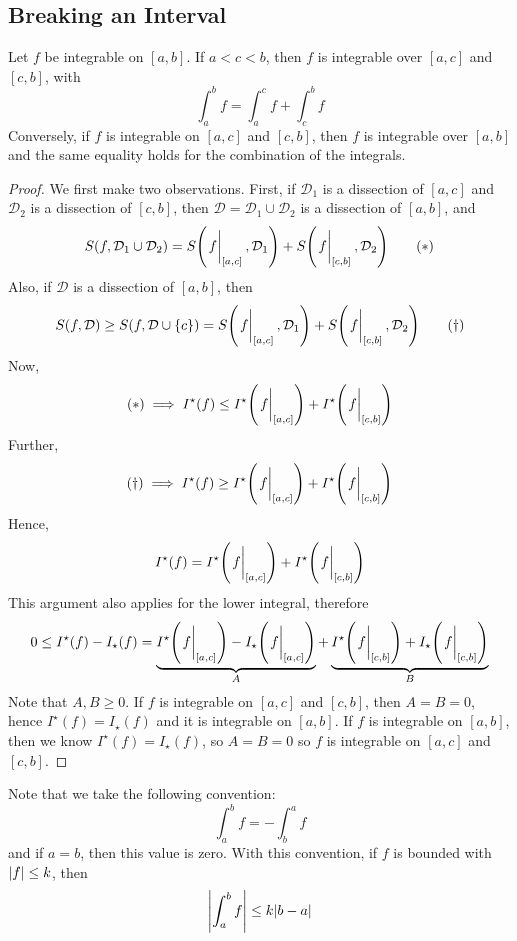 \subsection{Breaking an Interval}
Let $f$ be integrable on $[a, b]$. If $a < c < b$, then $f$ is integrable over $[a, c]$ and $[c, b]$, with
\[ \int_a^b f = \int_a^c f + \int_c^b f \]
Conversely, if $f$ is integrable on $[a, c]$ and $[c, b]$, then $f$ is integrable over $[a, b]$ and the same equality holds for the combination of the integrals.
\begin{proof}
	We first make two observations. First, if $\mathcal D_1$ is a dissection of $[a, c]$ and $\mathcal D_2$ is a dissection of $[c, b]$, then $\mathcal D = \mathcal D_1 \cup \mathcal D_2$ is a dissection of $[a, b]$, and
	\begin{equation}
		S(f, \mathcal D_1 \cup \mathcal D_2) = S\qty(\eval{f}_{[a, c]}, \mathcal D_1) + S\qty(\eval{f}_{[c, b]}, \mathcal D_2)
		\tag{$\ast$}
	\end{equation}
	Also, if $\mathcal D$ is a dissection of $[a, b]$, then
	\begin{equation}
		S(f, \mathcal D) \geq S(f, \mathcal D \cup \{ c \}) = S\qty(\eval{f}_{[a, c]}, \mathcal D_1) + S\qty(\eval{f}_{[c, b]}, \mathcal D_2)
		\tag{$\dagger$}
	\end{equation}
	Now,
	\[ (\ast) \implies I^\star(f) \leq I^\star\qty(\eval{f}_{[a, c]}) + I^\star\qty(\eval{f}_{[c, b]}) \]
	Further,
	\[ (\dagger) \implies I^\star(f) \geq I^\star\qty(\eval{f}_{[a, c]}) + I^\star\qty(\eval{f}_{[c, b]}) \]
	Hence,
	\[ I^\star(f) = I^\star\qty(\eval{f}_{[a, c]}) + I^\star\qty(\eval{f}_{[c, b]}) \]
	This argument also applies for the lower integral, therefore
	\[ 0 \leq I^\star(f) - I_\star(f) = \underbrace{I^\star\qty(\eval{f}_{[a, c]}) - I_\star\qty(\eval{f}_{[a, c]})}_{A} + \underbrace{I^\star\qty(\eval{f}_{[c, b]}) + I_\star\qty(\eval{f}_{[c, b]})}_{B} \]
	Note that $A, B \geq 0$. If $f$ is integrable on $[a, c]$ and $[c, b]$, then $A = B = 0$, hence $I^\star(f) = I_\star(f)$ and it is integrable on $[a, b]$. If $f$ is integrable on $[a, b]$, then we know $I^\star(f) = I_\star(f)$, so $A = B = 0$ so $f$ is integrable on $[a, c]$ and $[c, b]$.
\end{proof}
\noindent Note that we take the following convention:
\[ \int_a^b f = -\int_b^a f \]
and if $a=b$, then this value is zero. With this convention, if $f$ is bounded with $\abs{f} \leq k$, then
\[ \abs{\int_a^b f} \leq k\abs{b - a} \]

